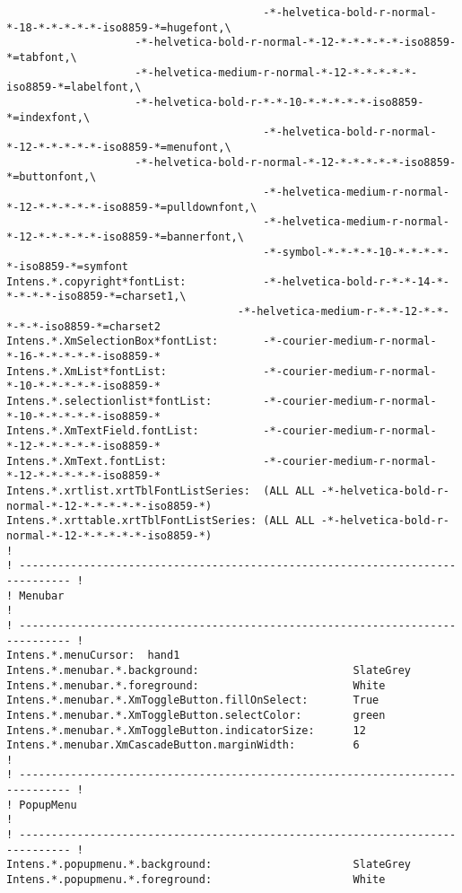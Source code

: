 {\begin{verbatim}
                                        -*-helvetica-bold-r-normal-*-18-*-*-*-*-*-iso8859-*=hugefont,\
					-*-helvetica-bold-r-normal-*-12-*-*-*-*-*-iso8859-*=tabfont,\
					-*-helvetica-medium-r-normal-*-12-*-*-*-*-*-iso8859-*=labelfont,\
					-*-helvetica-bold-r-*-*-10-*-*-*-*-*-iso8859-*=indexfont,\
                                        -*-helvetica-bold-r-normal-*-12-*-*-*-*-*-iso8859-*=menufont,\
					-*-helvetica-bold-r-normal-*-12-*-*-*-*-*-iso8859-*=buttonfont,\
                                        -*-helvetica-medium-r-normal-*-12-*-*-*-*-*-iso8859-*=pulldownfont,\
                                        -*-helvetica-medium-r-normal-*-12-*-*-*-*-*-iso8859-*=bannerfont,\
                                        -*-symbol-*-*-*-*-10-*-*-*-*-*-iso8859-*=symfont
Intens.*.copyright*fontList:            -*-helvetica-bold-r-*-*-14-*-*-*-*-*-iso8859-*=charset1,\
	                                -*-helvetica-medium-r-*-*-12-*-*-*-*-*-iso8859-*=charset2
Intens.*.XmSelectionBox*fontList:       -*-courier-medium-r-normal-*-16-*-*-*-*-*-iso8859-*
Intens.*.XmList*fontList:               -*-courier-medium-r-normal-*-10-*-*-*-*-*-iso8859-*
Intens.*.selectionlist*fontList:        -*-courier-medium-r-normal-*-10-*-*-*-*-*-iso8859-*
Intens.*.XmTextField.fontList:          -*-courier-medium-r-normal-*-12-*-*-*-*-*-iso8859-*
Intens.*.XmText.fontList:               -*-courier-medium-r-normal-*-12-*-*-*-*-*-iso8859-*
Intens.*.xrtlist.xrtTblFontListSeries:  (ALL ALL -*-helvetica-bold-r-normal-*-12-*-*-*-*-*-iso8859-*)
Intens.*.xrttable.xrtTblFontListSeries: (ALL ALL -*-helvetica-bold-r-normal-*-12-*-*-*-*-*-iso8859-*)
!
! ------------------------------------------------------------------------------ !
! Menubar                                                                        !
! ------------------------------------------------------------------------------ !
Intens.*.menuCursor:  hand1
Intens.*.menubar.*.background:                        SlateGrey
Intens.*.menubar.*.foreground:                        White
Intens.*.menubar.*.XmToggleButton.fillOnSelect:       True
Intens.*.menubar.*.XmToggleButton.selectColor:        green
Intens.*.menubar.*.XmToggleButton.indicatorSize:      12
Intens.*.menubar.XmCascadeButton.marginWidth:         6
!
! ------------------------------------------------------------------------------ !
! PopupMenu                                                                      !
! ------------------------------------------------------------------------------ !
Intens.*.popupmenu.*.background:                      SlateGrey
Intens.*.popupmenu.*.foreground:                      White

\end{verbatim}}
